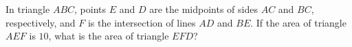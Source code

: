In triangle $ABC$, points $E$ and $D$ are the midpoints of sides $AC$ and $BC$, respectively, and $F$ is the intersection of lines $AD$ and $BE$. If the area of triangle $AEF$ is $10$, what is the area of triangle $EFD$?
